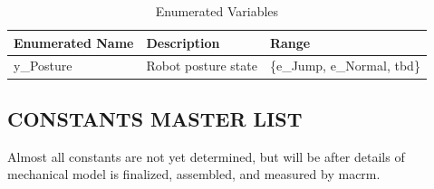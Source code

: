 \documentclass[12pt]{article}
\begin{document}
\begin{table}[H]
    \caption{Enumerated Variables}
    \begin{tabularx}{\textwidth}{|p{3cm}|X|X|}
        \toprule
        \textbf{Enumerated Name} & \textbf{Description} & \textbf{Range}                         \\
        \midrule
        y\_Posture               & Robot posture state  & \{e\_Jump, e\_Normal, \acrshort{tbd}\} \\
        \bottomrule
    \end{tabularx}
\end{table}

\subsection{CONSTANTS MASTER LIST}
Almost all constants are not yet determined, but will be after details of mechanical model is finalized, assembled, and measured by \acrshort{macrm}.
\end{document}
